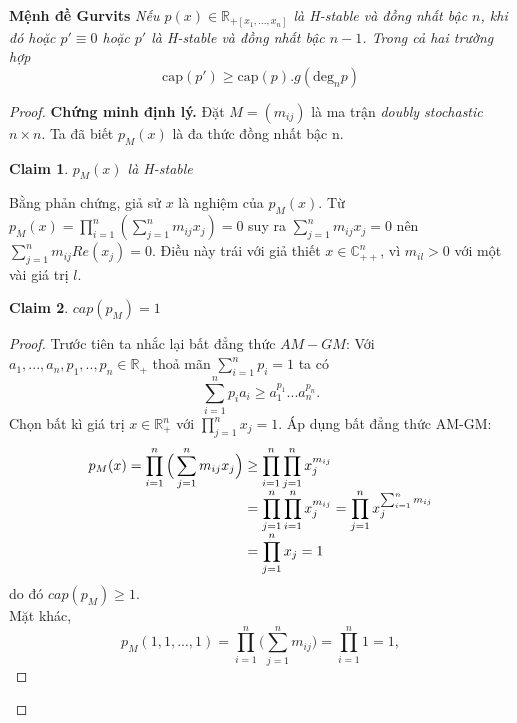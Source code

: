 \documentclass[a4paper, 12pt]{report}
\newtheorem{claim}{Claim}
\begin{document}
\textbf{Mệnh đề Gurvits}
\textit{Nếu $p(x) \in \mathbb{R}_{+[x_1,...,x_n]}$ là H-stable và đồng nhất bậc $n$, khi đó hoặc $p' \equiv 0$ hoặc $p'$ là H-stable và đồng nhất bậc $n-1$. Trong cả hai trường hợp}
\begin{equation*}
 \textrm{cap}(p') \geq \textrm{cap}(p).g(\textrm{deg}_{n}p)
\end{equation*}
\begin{proof}
	\textbf{Chứng minh định lý. }Đặt $M=(m_{ij})$ là ma trận \textit{doubly stochastic} $n \times n$. Ta đã biết $p_M(x)$ là đa thức đồng nhất bậc n.
\begin{claim}
	$p_M(x)$ là H-stable
\end{claim}
Bằng phản chứng, giả sử $x$ là nghiệm của $p_M(x)$. Từ $p_M(x) = \prod_{i=1}^{n} (\sum_{j=1}^{n} m_{ij}x_{j}) =0$ suy ra $\sum_{j=1}^{n} m_{ij}x_{j} =0$ nên $\sum_{j=1}^{n} m_{ij}Re(x_{j}) =0$. Điều này trái với giả thiết $x \in \mathbb{C}^{n}_{++}$, vì $m_{il} > 0$ với một vài giá trị $l$. 
\begin{claim}
	$cap(p_M) =1$
\end{claim}
\begin{proof}
	Trước tiên ta nhắc lại bất đẳng thức $AM-GM$: Với $a_1,...,a_n, p_1,..,p_n \in \mathbb{R}_{+}$ thoả mãn $\sum_{i=1}^{n}p_{i} =1$ ta có
	\begin{equation*}
	\displaystyle \sum_{i=1}^{n} p_{i}a_{i} \geq a_{1}^{p_1}...a_{n}^{p_n}.
\end{equation*}
Chọn bất kì giá trị $x \in \mathbb{R}_{+}^{n}$ với $\prod_{j=1}^{n}x_{j} =1$. Áp dụng bất đẳng thức AM-GM:
\begin{equation*}
\begin{array}{l@{}l}
	p_M(x) = \displaystyle \prod_{i=1}^{n} \Big( \displaystyle \sum_{j=1}^{n} m_{ij}x_{j} \Big) &{}\geq \displaystyle \prod_{i=1}^{n} \displaystyle\prod_{j=1}^{n} x_{j}^{m_{ij}} \\
	&{}= \displaystyle\prod_{j=1}^{n}\displaystyle \prod_{i=1}^{n}x_{j}^{m_{ij}} = \displaystyle\prod_{j=1}^{n} x_j^{\sum_{i=1}^{n} m_{ij}} \\
	&{}= \displaystyle\prod_{j=1}^{n} x_j =1
\end{array}
\end{equation*}
do đó $cap(p_M) \geq 1$. \\
Mặt khác,
\begin{equation}
	p_M(1,1,...,1) = \displaystyle \prod_{i=1}^{n} \Big (\displaystyle \sum_{j=1}^{n} m_{ij} \Big) = \displaystyle\prod_{i=1}^{n} 1 =1,
\end{equation}
\end{proof} 

\end{proof}
\end{document}

